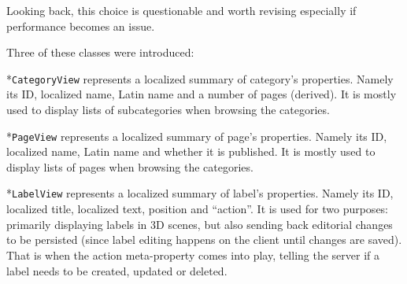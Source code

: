 Looking back, this choice is questionable and worth revising especially if performance becomes an issue.

Three of these classes were introduced:

\begitems

*{\tt CategoryView} represents a localized summary of category’s properties. Namely its ID, localized name, Latin name and a number of pages (derived). It is mostly used to display lists of subcategories when browsing the categories.

*{\tt PageView} represents a localized summary of page’s properties. Namely its ID, localized name, Latin name and whether it is published. It is mostly used to display lists of pages when browsing the categories.

*{\tt LabelView} represents a localized summary of label’s properties. Namely its ID, localized title, localized text, position and “action”. It is used for two purposes: primarily displaying labels in 3D scenes, but also sending back editorial changes to be persisted (since label editing happens on the client until changes are saved). That is when the action meta-property comes into play, telling the server if a label needs to be created, updated or deleted.

\enditems